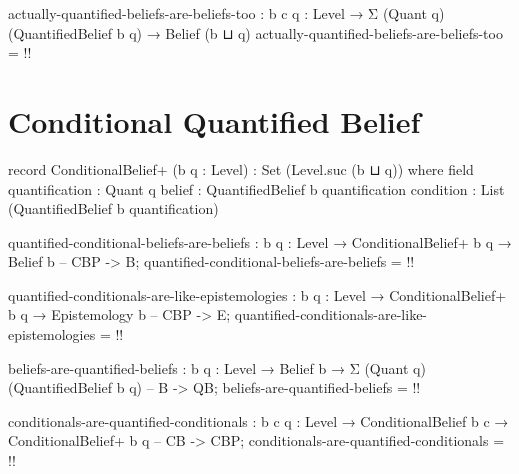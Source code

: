 \documentclass{article}
\begin{document}
\begin{code}
actually-quantified-beliefs-are-beliefs-too :
  {b c q : Level} → Σ (Quant q) (QuantifiedBelief b {q}) → Belief (b ⊔ q)
actually-quantified-beliefs-are-beliefs-too = {!!}
\end{code}

\section{Conditional Quantified Belief}

\begin{code}
record ConditionalBelief+ (b q : Level) : Set (Level.suc (b ⊔ q)) where
  field
    quantification : Quant q
    belief : QuantifiedBelief b quantification
    condition : List (QuantifiedBelief b quantification)
\end{code}

\begin{code}
quantified-conditional-beliefs-are-beliefs :
  {b q : Level} → ConditionalBelief+ b q → Belief b -- CBP -> B;
quantified-conditional-beliefs-are-beliefs = {!!}
\end{code}

\begin{code}
quantified-conditionals-are-like-epistemologies :
  {b q : Level} → ConditionalBelief+ b q → Epistemology b -- CBP -> E;
quantified-conditionals-are-like-epistemologies = {!!}
\end{code}

\begin{code}
beliefs-are-quantified-beliefs :
  {b q : Level} → Belief b → Σ (Quant q) (QuantifiedBelief b {q}) -- B -> QB;
beliefs-are-quantified-beliefs = {!!}
\end{code}

\begin{code}
conditionals-are-quantified-conditionals :
  {b c q : Level} → ConditionalBelief b c → ConditionalBelief+ b q -- CB -> CBP;
conditionals-are-quantified-conditionals = {!!}
\end{code}
\end{document}
